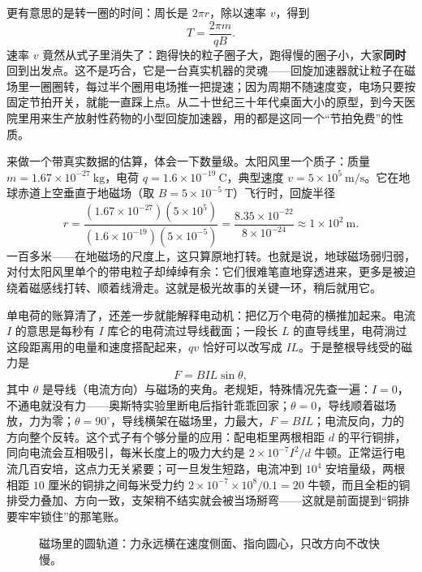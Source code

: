 \begin{mainline}
更有意思的是转一圈的时间：周长是 \(2\pi r\)，除以速率 \(v\)，得到
\[
T=\frac{2\pi m}{qB}.
\]
速率 \(v\) 竟然从式子里消失了：跑得快的粒子圈子大，跑得慢的圈子小，大家\textbf{同时}回到出发点。这不是巧合，它是一台真实机器的灵魂——回旋加速器就让粒子在磁场里一圈圈转，每过半个圈用电场推一把提速；因为周期不随速度变，电场只要按固定节拍开关，就能一直踩上点。从二十世纪三十年代桌面大小的原型，到今天医院里用来生产放射性药物的小型回旋加速器，用的都是这同一个“节拍免费”的性质。

来做一个带真实数据的估算，体会一下数量级。太阳风里一个质子：质量 \(m=1.67\times10^{-27}\ \mathrm{kg}\)，电荷 \(q=1.6\times10^{-19}\ \mathrm C\)，典型速度 \(v=5\times10^{5}\ \mathrm{m/s}\)。它在地球赤道上空垂直于地磁场（取 \(B=5\times10^{-5}\ \mathrm T\)）飞行时，回旋半径
\[
r=\frac{(1.67\times10^{-27})(5\times10^{5})}{(1.6\times10^{-19})(5\times10^{-5})}
=\frac{8.35\times10^{-22}}{8\times10^{-24}}\approx 1\times10^{2}\ \mathrm m.
\]
一百多米——在地磁场的尺度上，这只算原地打转。也就是说，地球磁场弱归弱，对付太阳风里单个的带电粒子却绰绰有余：它们很难笔直地穿透进来，更多是被迫绕着磁感线打转、顺着线滑走。这就是极光故事的关键一环，稍后就用它。

单电荷的账算清了，还差一步就能解释电动机：把亿万个电荷的横推加起来。电流 \(I\) 的意思是每秒有 \(I\) 库仑的电荷流过导线截面；一段长 \(L\) 的直导线里，电荷淌过这段距离用的电量和速度搭配起来，\(qv\) 恰好可以改写成 \(IL\)。于是整根导线受的磁力是
\[
F=BIL\sin\theta ,
\]
其中 \(\theta\) 是导线（电流方向）与磁场的夹角。老规矩，特殊情况先查一遍：\(I=0\)，不通电就没有力——奥斯特实验里断电后指针乖乖回家；\(\theta=0\)，导线顺着磁场放，力为零；\(\theta=90^\circ\)，导线横架在磁场里，力最大，\(F=BIL\)；电流反向，力的方向整个反转。这个式子有个够分量的应用：配电柜里两根相距 \(d\) 的平行铜排，同向电流会互相吸引，每米长度上的吸力大约是 \(2\times10^{-7}I^{2}/d\) 牛顿。正常运行电流几百安培，这点力无关紧要；可一旦发生短路，电流冲到 \(10^{4}\) 安培量级，两根相距 \(10\) 厘米的铜排之间每米受力约 \(2\times10^{-7}\times10^{8}/0.1=20\) 牛顿，而且全柜的铜排受力叠加、方向一致，支架稍不结实就会被当场掰弯——这就是前面提到“铜排要牢牢锁住”的那笔账。
\end{mainline}

\begin{figure}[htbp]
\centering
{}
\caption{磁场里的圆轨道：力永远横在速度侧面、指向圆心，只改方向不改快慢。}
\end{figure}

